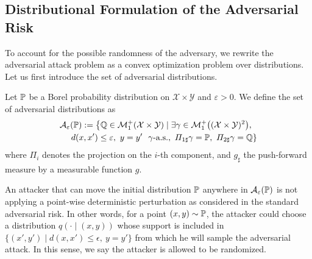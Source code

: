 \subsection{Distributional Formulation of the Adversarial Risk} 

To account for the possible randomness of the adversary, we rewrite the adversarial attack problem as a convex optimization problem over distributions. Let us first introduce the set of adversarial distributions.
\begin{definition}
Let $\mathbb{P}$ be a Borel probability distribution on $\mathcal{X}\times\mathcal{Y}$ and $\varepsilon>0$. We define the set of adversarial distributions as
\begin{align*}
\mathcal{A}_{\varepsilon}&(\PP) := \left\{\QQ\in\mathcal{M}^+_1(\mathcal{X}\times\mathcal{Y})\mid\exists \gamma\in\mathcal{M}^+_1\left((\mathcal{X}\times\mathcal{Y})^2\right),\right.\\
&\left.d(x,x')\leq\varepsilon,~y=y'~~ \gamma\text{-a.s.},~\Pi_{1\sharp}\gamma=\PP,~\Pi_{2\sharp}\gamma=\QQ\right\} 
\end{align*}
where $\Pi_i$ denotes the projection on the $i$-th component, and $g_\sharp$ the push-forward measure by a measurable function $g$.
\end{definition}
An attacker that can move the initial distribution $\mathbb{P}$ anywhere in $\mathcal{A}_\varepsilon(\mathbb{P})$ is not applying a point-wise deterministic perturbation as considered in the standard adversarial risk. %
In other words, for a point $(x,y)\sim\mathbb{P}$, the attacker could choose a distribution $q(\cdot\mid(x,y))$ whose support is included in $\{(x',y')\mid d(x,x')\leq \epsilon,~y=y'\}$ from which he will sample the adversarial attack. In this sense, we say the attacker is allowed to be randomized.

